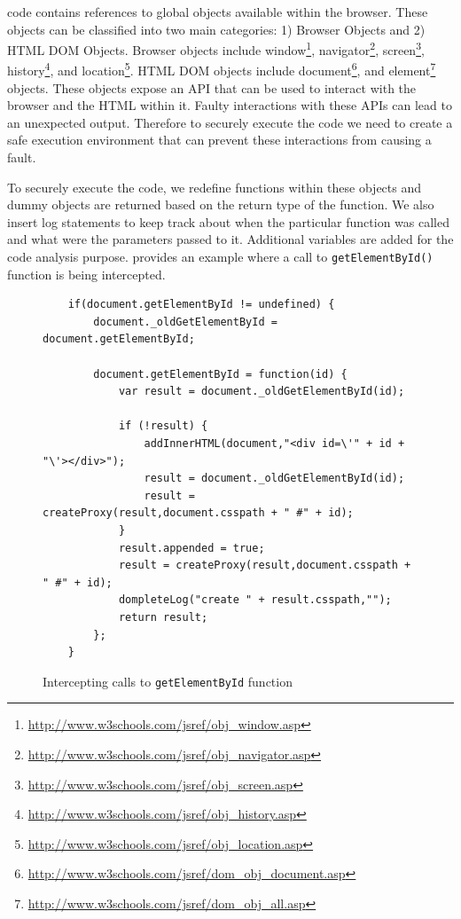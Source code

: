		
			\javascript code contains references to global objects available within the browser. These objects can be classified into two main categories: 1) Browser Objects and 2) HTML DOM Objects. Browser objects include window\footnote{\url{http://www.w3schools.com/jsref/obj_window.asp}}, navigator\footnote{\url{http://www.w3schools.com/jsref/obj_navigator.asp}}, screen\footnote{\url{http://www.w3schools.com/jsref/obj_screen.asp}}, history\footnote{\url{http://www.w3schools.com/jsref/obj_history.asp}},  and location\footnote{\url{http://www.w3schools.com/jsref/obj_location.asp}}. HTML DOM objects include document\footnote{\url{http://www.w3schools.com/jsref/dom_obj_document.asp}}, and element\footnote{\url{http://www.w3schools.com/jsref/dom_obj_all.asp}} objects. These objects expose an API that can be used to interact with the browser and the HTML within it. Faulty interactions with these APIs can lead to an unexpected output. Therefore to securely execute the code we need to create a safe execution environment that can prevent these interactions from causing a fault.
			
			To securely execute the \javascript code, we redefine functions within these objects and dummy objects are returned based on the return type of the function. We also insert log statements to keep track about when the particular function was called and what were the parameters passed to it. Additional variables are added for the code analysis purpose.  provides an example where a call to \texttt{getElementById()} function is being intercepted.
			
			
			\begin{figure}
			\medskip
			\begin{lstlisting}
	if(document.getElementById != undefined) { 
		document._oldGetElementById = document.getElementById; 
			
		document.getElementById = function(id) { 
			var result = document._oldGetElementById(id); 
				
			if (!result) { 
				addInnerHTML(document,"<div id=\'" + id + "\'></div>"); 
				result = document._oldGetElementById(id); 
				result = createProxy(result,document.csspath + " #" + id); 
			} 
			result.appended = true;
			result = createProxy(result,document.csspath + " #" + id);
			dompleteLog("create " + result.csspath,"");
			return result; 
		}; 
	}
			\end{lstlisting}
			\caption{Intercepting calls to \texttt{getElementById} function}
			\label{Fig:Environment}
			\end{figure}
	
